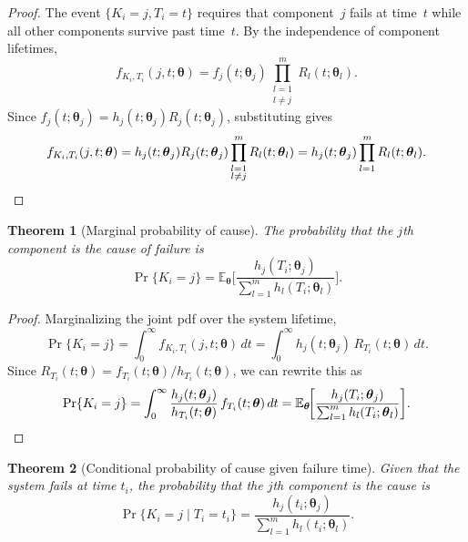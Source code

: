\documentclass[11pt]{article}
\theoremstyle{definition}
\theoremstyle{plain}
\newtheorem{theorem}{Theorem}
\renewcommand{\v}[1]{\boldsymbol{#1}}
\newcommand{\btheta}{\v{\theta}}
\newcommand{\E}{\mathbb{E}}
\begin{document}
\begin{proof}
The event $\{K_i = j, T_i = t\}$ requires that component~$j$ fails at
time~$t$ while all other components survive past time~$t$.
By the independence of component lifetimes,
\[
    f_{K_i, T_i}(j, t; \btheta)
    = f_j(t; \v{\theta}_j) \prod_{\substack{l=1 \\ l \neq j}}^m
        R_l(t; \v{\theta}_l).
\]
Since $f_j(t; \v{\theta}_j) = h_j(t; \v{\theta}_j) R_j(t; \v{\theta}_j)$,
substituting gives
\[
    f_{K_i, T_i}(j, t; \btheta)
    = h_j(t; \v{\theta}_j) R_j(t; \v{\theta}_j)
        \prod_{\substack{l=1 \\ l \neq j}}^m R_l(t; \v{\theta}_l)
    = h_j(t; \v{\theta}_j) \prod_{l=1}^m R_l(t; \v{\theta}_l).
    \qedhere
\]
\end{proof}

\begin{theorem}[Marginal probability of cause]
\label{thm:prob-k}
The probability that the $j$th component is the cause of failure is
\begin{equation}
\label{eq:prob-k}
    \Pr\{K_i = j\} = \E_{\btheta}\!\biggl[
        \frac{h_j(T_i; \v{\theta}_j)}
             {\sum_{l=1}^m h_l(T_i; \v{\theta}_l)}
    \biggr].
\end{equation}
\end{theorem}

\begin{proof}
Marginalizing the joint pdf over the system lifetime,
\[
    \Pr\{K_i = j\}
    = \int_0^\infty f_{K_i, T_i}(j, t; \btheta) \, dt
    = \int_0^\infty h_j(t; \v{\theta}_j) \, R_{T_i}(t; \btheta) \, dt.
\]
Since $R_{T_i}(t; \btheta) = f_{T_i}(t; \btheta) / h_{T_i}(t; \btheta)$,
we can rewrite this as
\[
    \Pr\{K_i = j\}
    = \int_0^\infty
        \frac{h_j(t; \v{\theta}_j)}{h_{T_i}(t; \btheta)}
        \, f_{T_i}(t; \btheta) \, dt
    = \E_{\btheta}\!\biggl[
        \frac{h_j(T_i; \v{\theta}_j)}
             {\sum_{l=1}^m h_l(T_i; \v{\theta}_l)}
    \biggr].
    \qedhere
\]
\end{proof}

\begin{theorem}[Conditional probability of cause given failure time]
\label{thm:prob-k-given-t}
Given that the system fails at time $t_i$, the probability that the
$j$th component is the cause is
\begin{equation}
\label{eq:prob-k-given-t}
    \Pr\{K_i = j \mid T_i = t_i\}
    = \frac{h_j(t_i; \v{\theta}_j)}
           {\sum_{l=1}^m h_l(t_i; \v{\theta}_l)}.
\end{equation}
\end{theorem}
\end{document}
